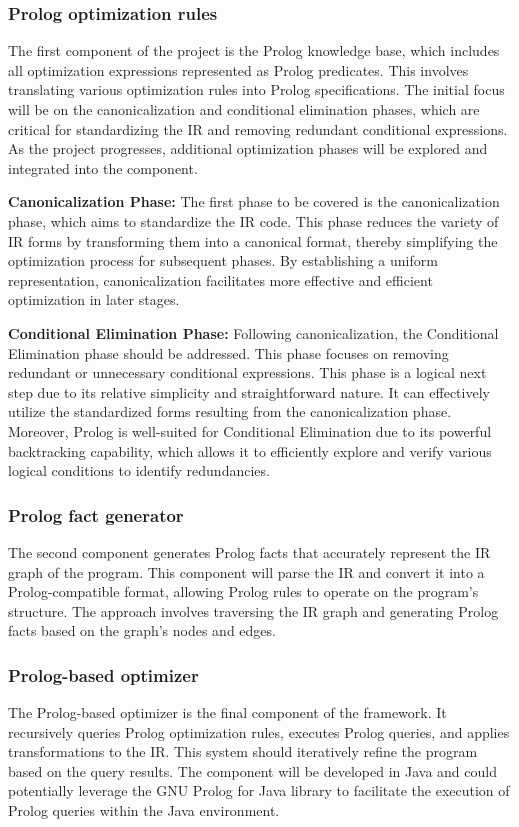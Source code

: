 \subsubsection{Prolog optimization rules}
The first component of the project is the Prolog knowledge base, which includes all optimization expressions represented as Prolog predicates. This involves translating various optimization rules into Prolog specifications. The initial focus will be on the canonicalization and conditional elimination phases, which are critical for standardizing the IR and removing redundant conditional expressions. As the project progresses, additional optimization phases will be explored and integrated into the component.
\newpage
\begin{description}
    \item \textbf{Canonicalization Phase:} The first phase to be covered is the canonicalization phase, which aims to standardize the IR code. This phase reduces the variety of IR forms by transforming them into a canonical format, thereby simplifying the optimization process for subsequent phases. By establishing a uniform representation, canonicalization facilitates more effective and efficient optimization in later stages.
    \item \textbf{Conditional Elimination Phase:} Following canonicalization, the Conditional Elimination phase should be addressed. This phase focuses on removing redundant or unnecessary conditional expressions. This phase is a logical next step due to its relative simplicity and straightforward nature. It can effectively utilize the standardized forms resulting from the canonicalization phase. Moreover, Prolog is well-suited for Conditional Elimination due to its powerful backtracking capability, which allows it to efficiently explore and verify various logical conditions to identify redundancies.
\end{description}

\subsubsection{Prolog fact generator}
The second component generates Prolog facts that accurately represent the IR graph of the program. This component will parse the IR and convert it into a Prolog-compatible format, allowing Prolog rules to operate on the program's structure. The approach involves traversing the IR graph and generating Prolog facts based on the graph's nodes and edges.

\subsubsection{Prolog-based optimizer}
The Prolog-based optimizer is the final component of the framework. It recursively queries Prolog optimization rules, executes Prolog queries, and applies transformations to the IR. This system should iteratively refine the program based on the query results. The component will be developed in Java and could potentially leverage the GNU Prolog for Java library to facilitate the execution of Prolog queries within the Java environment. 

